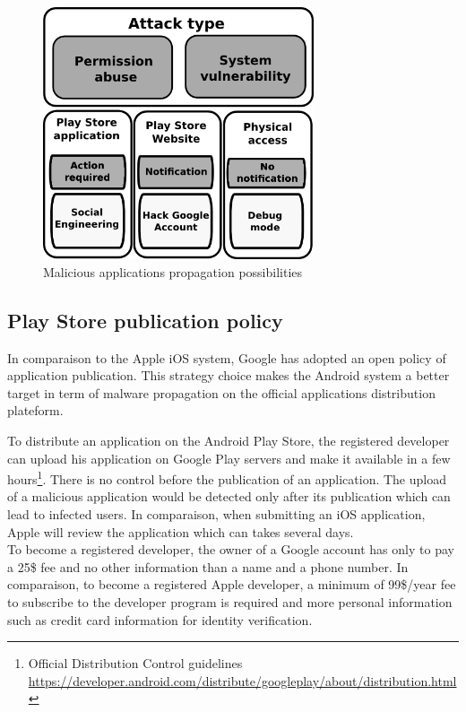 \begin{figure}[h]
  \centering
  \includegraphics[width=8cm]{images/secu-graph.png}
  \caption{Malicious applications propagation possibilities}
  \label{fig:secu-graph}
\end{figure}

\subsection{Play Store publication policy}

In comparaison to the Apple iOS system, Google has adopted an open policy of application publication.
This strategy choice makes the Android system a better target in term of malware propagation on the official applications distribution plateform.

To distribute an application on the Android Play Store, the registered developer can upload his application on Google Play servers and make it available in a few hours\footnote{Official Distribution Control guidelines \url{https://developer.android.com/distribute/googleplay/about/distribution.html}}.
There is no control before the publication of an application.
The upload of a malicious application would be detected only after its publication which can lead to infected users.
In comparaison, when submitting an iOS application, Apple will review the application which can takes several days.\\

To become a registered developer, the owner of a Google account has only to pay a 25\$ fee and no other information than a name and a phone number.
In comparaison, to become a registered Apple developer, a minimum of 99\$/year fee to subscribe to the developer program is required and more personal information such as credit card information for identity verification.\\

